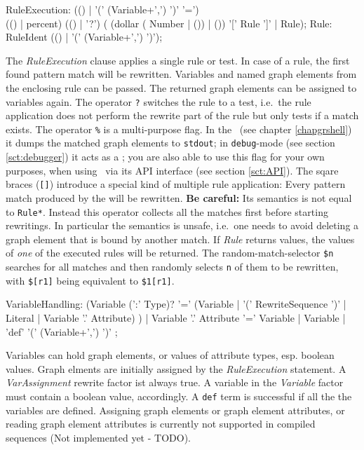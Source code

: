 \begin{rail}    
  RuleExecution: (() | '(' (Variable+',') ')' '=') \\ (() | percent) (() | '?') ( (dollar ( Number | ()) | ()) '[' Rule ']' | Rule);   
  Rule: RuleIdent (() | '(' (Variable+',') ')');
\end{rail}  
The \emph{RuleExecution} clause applies a single rule or test.
In case of a rule, the first found pattern match will be rewritten.
Variables and named graph elements from the enclosing rule can be passed.
The returned graph elements can be assigned to variables again.
The operator \texttt{?} switches the rule to a test, i.e.\ the rule application does not perform the rewrite part of the rule but only tests if a match exists.
The operator \texttt{\%} is a multi-purpose flag. 
In the \GrShell\ (see chapter \ref{chapgrshell}) it dumps the matched graph elements to \texttt{stdout};
in \texttt{debug}-mode (see section \ref{sct:debugger}) it acts as a ;
you are also able to use this flag for your own purposes, when using \GrG\ via its API interface (see section \ref{sct:API}).
The sqare braces (\texttt{[]}) introduce a special kind of multiple rule application:
Every pattern match produced by the will be rewritten.
\textbf{Be careful:} Its semantics is not equal to \texttt{Rule*}.
Instead this operator collects all the matches first before starting rewritings.
In particular the semantics is unsafe, i.e.\ one needs to avoid deleting a graph element that is bound by another match.
If \emph{Rule} returns values, the values of \emph{one} of the executed rules will be returned.
The random-match-selector \texttt{\$n} searches for all matches and then randomly selects \texttt{n} of them to be rewritten, with \texttt{\$[r1]} being equivalent to \texttt{\$1[r1]}.

\begin{rail}
  VariableHandling: 
    (Variable (':' Type)? '=' 
	  (Variable | 
      '(' RewriteSequence ')' | 
      Literal | 
	  Variable '.' Attribute)
    ) |
	Variable '.' Attribute '=' Variable |
    Variable |
    'def' '(' (Variable+',') ')'
  ;
\end{rail}\makeatother
Variables can hold graph elements, or values of attribute types, esp. boolean values.
Graph elments are initially assigned by the \emph{RuleExecution} statement.
A \emph{VarAssignment} rewrite factor ist always true.
A variable in the \emph{Variable} factor must contain a boolean value, accordingly.
A \texttt{def} term is successful if all the the variables are defined.
Assigning graph elements or graph element attributes, or reading graph element attributes is currently not supported in compiled sequences (Not implemented yet - TODO).

